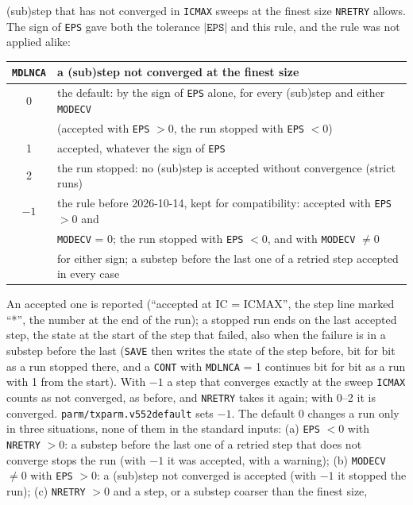 \documentclass[11pt]{article}
\begin{document}
\begin{itemize}
  (sub)step that has not converged in \texttt{ICMAX} sweeps at the finest size \texttt{NRETRY}
  allows.  The sign of \texttt{EPS} gave both the tolerance $|\texttt{EPS}|$ and this rule, and the
  rule was not applied alike:
  \begin{center}
  \begin{tabular}{|c|l|}\hline
  \texttt{MDLNCA} & a (sub)step not converged at the finest size \\\hline
  0 & the default: by the sign of \texttt{EPS} alone, for every (sub)step and either \texttt{MODECV} \\
    & (accepted with \texttt{EPS} $>0$, the run stopped with \texttt{EPS} $<0$) \\
  1 & accepted, whatever the sign of \texttt{EPS} \\
  2 & the run stopped: no (sub)step is accepted without convergence (strict runs) \\
  $-1$ & the rule before 2026-10-14, kept for compatibility: accepted with \texttt{EPS} $>0$ and \\
       & \texttt{MODECV} = 0; the run stopped with \texttt{EPS} $<0$, and with \texttt{MODECV} $\ne 0$ \\
       & for either sign; a substep before the last one of a retried step accepted in every case \\\hline
  \end{tabular}
  \end{center}
  An accepted one is reported (``accepted at IC = ICMAX'', the step line marked ``*'', the number
  at the end of the run); a stopped run ends on the last accepted step, the state at the start of
  the step that failed, also when the failure is in a substep before the last (\texttt{SAVE} then
  writes the state of the step before, bit for bit as a run stopped there, and a \texttt{CONT} with
  \texttt{MDLNCA} = 1 continues bit for bit as a run with 1 from the start).  With $-1$ a step that
  converges exactly at the sweep \texttt{ICMAX} counts as not converged, as before, and
  \texttt{NRETRY} takes it again; with 0--2 it is converged.  \texttt{parm/txparm.v552default} sets
  $-1$.  The default 0 changes a run only in three situations, none of them in the standard inputs:
  (a) \texttt{EPS} $<0$ with \texttt{NRETRY} $>0$: a substep before the last one of a retried step
  that does not converge stops the run (with $-1$ it was accepted, with a warning); (b)
  \texttt{MODECV} $\ne 0$ with \texttt{EPS} $>0$: a (sub)step not converged is accepted (with $-1$ it
  stopped the run); (c) \texttt{NRETRY} $>0$ and a step, or a substep coarser than the finest size,

\end{itemize}
\end{document}
